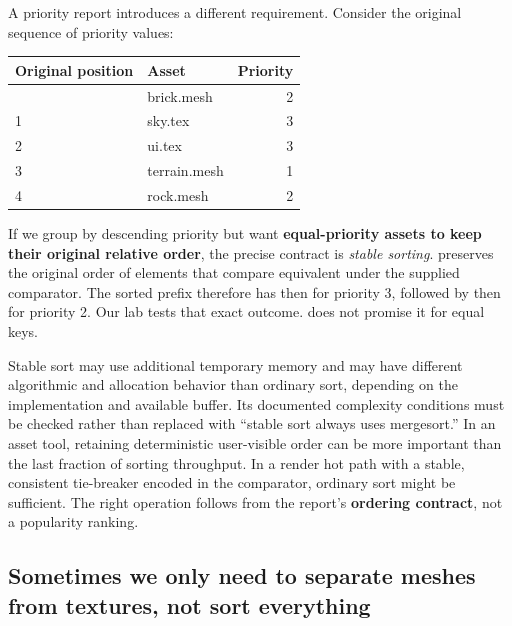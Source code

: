 A priority report introduces a different requirement. Consider the original sequence of priority values:

{\def\LTcaptype{none} %
\begin{longtable}[]{@{}llr@{}}
\toprule\noalign{}
Original position & Asset & Priority \\
\midrule\noalign{}
\endhead
\bottomrule\noalign{}
\endlastfoot
0 & brick.mesh & 2 \\
1 & sky.tex & 3 \\
2 & ui.tex & 3 \\
3 & terrain.mesh & 1 \\
4 & rock.mesh & 2 \\
\end{longtable}
}

If we group by descending priority but want \textbf{equal-priority assets to keep their original relative order}, the precise contract is \emph{stable sorting}.  preserves the original order of elements that compare equivalent under the supplied comparator. The sorted prefix therefore has  then  for priority 3, followed by  then  for priority 2. Our lab tests that exact outcome.  does not promise it for equal keys.

Stable sort may use additional temporary memory and may have different algorithmic and allocation behavior than ordinary sort, depending on the implementation and available buffer. Its documented complexity conditions must be checked rather than replaced with ``stable sort always uses mergesort.'' In an asset tool, retaining deterministic user-visible order can be more important than the last fraction of sorting throughput. In a render hot path with a stable, consistent tie-breaker encoded in the comparator, ordinary sort might be sufficient. The right operation follows from the report's \textbf{ordering contract}, not a popularity ranking.

\subsection{Sometimes we only need to separate meshes from textures, not sort everything}\label{05-engine-i-ch006-sometimes-we-only-need-to-separate-meshes-from-textures-not-sort-everything}

\hypertarget{05-engine-i-ch006-sometimes-we-only-need-to-separate-meshes-from-textures-not-sort-everything}{}

